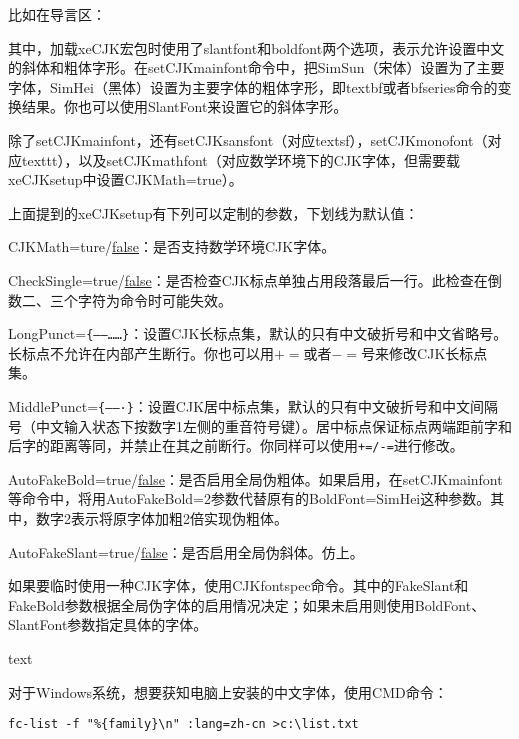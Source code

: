 {比如在导言区：
\begin{latex}{}
\usepackage[slantfont,boldfont]{xeCJK}
\end{latex}

其中，加载xeCJK宏包时使用了slantfont和boldfont两个选项，表示允许设置中文的斜体和粗体字形。在setCJKmainfont命令中，把SimSun（宋体）设置为了主要字体，SimHei（黑体）设置为主要字体的粗体字形，即textbf或者bfseries命令的变换结果。你也可以使用SlantFont来设置它的斜体字形。

除了setCJKmainfont，还有setCJKsansfont（对应textsf），setCJKmonofont（对应texttt），以及setCJKmathfont（对应数学环境下的CJK字体，但需要载xeCJKsetup中设置CJKMath=true）。

上面提到的xeCJKsetup有下列可以定制的参数，下划线为默认值：
\begin{feai}
\item CJKMath=ture/\uline{false}：是否支持数学环境CJK字体。
\item CheckSingle=true/\uline{false}：是否检查CJK标点单独占用段落最后一行。此检查在倒数二、三个字符为命令时可能失效。
\item LongPunct=\verb|{——……}|：设置CJK长标点集，默认的只有中文破折号和中文省略号。长标点不允许在内部产生断行。你也可以用$+=$或者$-=$号来修改CJK长标点集。
\item MiddlePunct=\verb|{——·}|：设置CJK居中标点集，默认的只有中文破折号和中文间隔号（中文输入状态下按数字1左侧的重音符号键）。居中标点保证标点两端距前字和后字的距离等同，并禁止在其之前断行。你同样可以使用\texttt{+=/-=}进行修改。
\item AutoFakeBold=true/\uline{false}：是否启用全局伪粗体。如果启用，在setCJKmainfont等命令中，将用AutoFakeBold=2参数代替原有的BoldFont=SimHei这种参数。其中，数字2表示将原字体加粗2倍实现伪粗体。
\item AutoFakeSlant=true/\uline{false}：是否启用全局伪斜体。仿上。
\end{feai}

如果要临时使用一种CJK字体，使用CJKfontspec命令。其中的FakeSlant和FakeBold参数根据全局伪字体的启用情况决定；如果未启用则使用BoldFont、SlantFont参数指定具体的字体。
\begin{latex}{}
{ text}
\end{latex}

对于Windows系统，想要获知电脑上安装的中文字体，使用CMD命令：
\begin{verbatim}
fc-list -f "%{family}\n" :lang=zh-cn >c:\list.txt
\end{verbatim}

}
